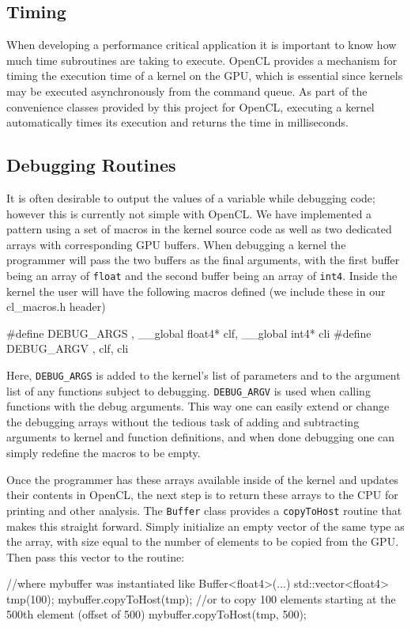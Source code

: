 \subsection{Timing}

When developing a performance critical application it is important to know how
much time subroutines are taking to execute. OpenCL provides a mechanism for
timing the execution time of a kernel on the GPU, which is essential since
kernels may be executed asynchronously from the command queue. As part of the
convenience classes provided by this project for OpenCL, executing a kernel
automatically times its execution and returns the time in milliseconds.




\subsection{Debugging Routines}

It is often desirable to output the values of a variable while debugging code;
however this is currently not simple with OpenCL. We have implemented a pattern
using a set of macros in the kernel source code as well as two dedicated arrays
with corresponding GPU buffers. When debugging a kernel the programmer will
pass the two buffers as the final arguments, with the first buffer being an
array of \verb|float| and the second buffer being an array of \verb|int4|. 
Inside the kernel the user will have the following macros defined (we include
these in our cl\_macros.h header)
\begin{cppcode}{0}
#define DEBUG_ARGS  , __global float4* clf, __global int4* cli
#define DEBUG_ARGV  , clf, cli
\end{cppcode}

Here, \verb|DEBUG_ARGS| is added to the kernel's list of parameters and 
to the argument list of any functions subject to debugging.
\verb|DEBUG_ARGV| is used when calling functions with the debug arguments. This
way one can easily extend or change the debugging arrays without the tedious
task of adding and subtracting arguments to kernel and function definitions,
and when done debugging one can simply redefine the macros to be empty.

Once the programmer has these arrays available inside of the kernel and updates
their contents in OpenCL, the next step is to return these arrays to the
CPU for printing and other analysis. The \verb|Buffer| class provides a
\verb|copyToHost| routine that makes this straight forward. Simply initialize
an empty vector of the same type as the array, with size equal to the
number of elements to be copied from the GPU. Then pass this vector to the routine:
\begin{cppcode}{0}
//where mybuffer was instantiated like Buffer<float4>(...)
std::vector<float4> tmp(100);
mybuffer.copyToHost(tmp);
//or to copy 100 elements starting at the 500th element (offset of 500)
mybuffer.copyToHost(tmp, 500);
\end{cppcode}

